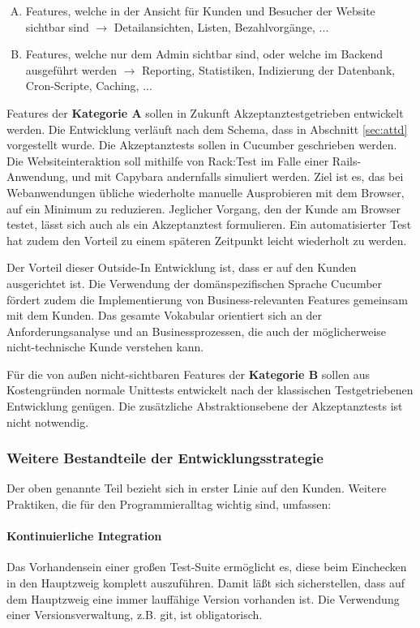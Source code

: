 \begin{enumerate}[A.]
 
 \item Features, welche in der Ansicht für Kunden und Besucher der Website sichtbar sind $\to$ Detailansichten, Listen, Bezahlvorgänge, ...
 \item Features, welche nur dem Admin sichtbar sind, oder welche im Backend ausgeführt werden $\to$ Reporting, Statistiken, Indizierung der Datenbank, Cron-Scripte, Caching, ...
\end{enumerate}

Features der \textbf{Kategorie A} sollen in Zukunft Akzeptanztestgetrieben entwickelt werden. Die Entwicklung verläuft nach dem Schema, dass in Abschnitt \ref{sec:attd} vorgestellt wurde. Die Akzeptanztests sollen in Cucumber geschrieben werden. Die Websiteinteraktion soll mithilfe von Rack:Test im Falle einer Rails-Anwendung, und mit Capybara andernfalls simuliert werden.
Ziel ist es, das bei Webanwendungen übliche wiederholte manuelle Ausprobieren mit dem Browser, auf ein Minimum zu reduzieren. Jeglicher Vorgang, den der Kunde am Browser testet, lässt sich auch als ein Akzeptanztest formulieren. Ein automatisierter Test hat zudem den Vorteil zu einem späteren Zeitpunkt leicht wiederholt zu werden. 

Der Vorteil dieser Outside-In Entwicklung ist, dass er auf den Kunden ausgerichtet ist. Die Verwendung der domänspezifischen Sprache Cucumber fördert zudem die Implementierung von Business-relevanten Features gemeinsam mit dem Kunden. Das gesamte Vokabular orientiert sich an der Anforderungsanalyse und an Businessprozessen, die auch der möglicherweise nicht-technische Kunde verstehen kann.

Für die von außen nicht-sichtbaren Features der \textbf{Kategorie B} sollen aus Kostengründen normale Unittests entwickelt nach der klassischen Testgetriebenen Entwicklung genügen. Die zusätzliche Abstraktionsebene der Akzeptanztests ist nicht notwendig.

\subsubsection{Weitere Bestandteile der Entwicklungsstrategie}
\label{sec:auswahlWeitere}

Der oben genannte Teil bezieht sich in erster Linie auf den Kunden. Weitere Praktiken, die für den Programmieralltag wichtig sind, umfassen:

\paragraph{Kontinuierliche Integration} Das Vorhandensein einer großen Test-Suite ermöglicht es, diese beim Einchecken in den Hauptzweig komplett auszuführen. Damit läßt sich sicherstellen, dass auf dem Hauptzweig eine immer lauffähige Version vorhanden ist. Die Verwendung einer Versionsverwaltung, z.B. git, ist obligatorisch.

